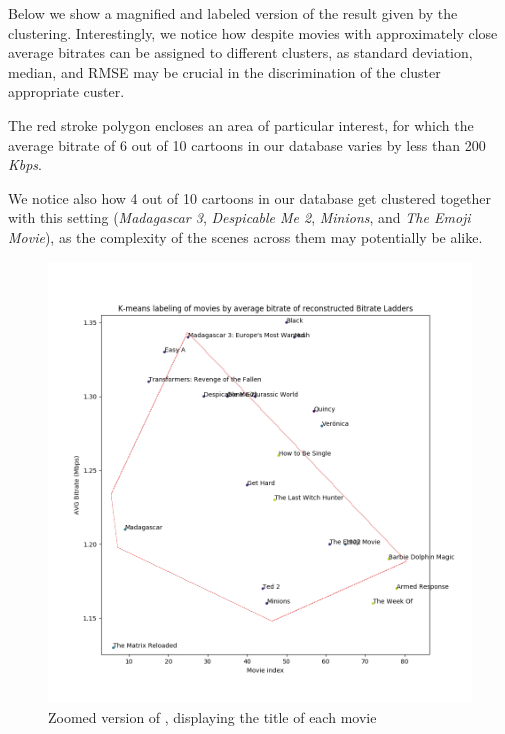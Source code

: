 Below we show a magnified and labeled version of the result given by the
clustering. Interestingly, we notice how despite movies with approximately
close average bitrates can be assigned to different clusters, as standard
deviation, median, and RMSE may be crucial in the discrimination of the cluster
appropriate custer. 

The red stroke polygon encloses an area of particular
interest, for which the average bitrate of 6 out of 10 cartoons in our database
varies by less than 200 \emph{Kbps}. 

We notice also how  4 out of 10 cartoons in our database get clustered together
with this setting (\emph{Madagascar 3}, \emph{Despicable Me 2}, \emph{Minions},
and \emph{The Emoji Movie}), as the complexity of the scenes across them may
potentially be alike. 

\begin{figure}[!h]
  \centering
  \includegraphics[width=\columnwidth]{img/zoomed.png}
  \caption{Zoomed version of , displaying the title of each movie}
  \label{fig:zoomed}
\end{figure}

